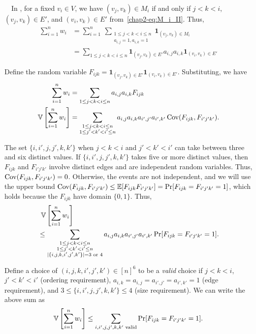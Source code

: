 {%
\smallskip
{}~~In \AlgTwo{}, for a fixed
$v_i \in V$, we have $(v_j, v_k) \in M_i$ if and only if
$j < k < i$, $(v_j, v_k) \in E'$, and $(v_i, v_k) \in E'$ from~\eqref{chap2-eq:M_i_II}. Thus,
\begin{align*}
\sum_{i=1}^n w_i &= \sum_{i=1}^n~\sum_{\substack{1 \leq j < k < i \leq n \\
a_{i,j} = 1, a_{i,k} = 1}} \textbf{1}_{(v_j, v_k) \in M_i} \\
&= \sum_{1 \leq j < k < i \leq n}
\textbf{1}_{(v_j, v_k) \in E'} a_{i,j}a_{i,k}\textbf{1}_{(v_i, v_k) \in E'}
\end{align*}

Define the random variable $F_{ijk} = \textbf{1}_{(v_j, v_k) \in
E'} \textbf{1}_{(v_i, v_k) \in E'}$. Substituting, we have
\begin{align*}
  \sum_{i=1}^n w_i &= \sum_{1 \leq j < k < i \leq n} a_{i,j} a_{i,k}F_{ijk} \\
  \operatorname{\mathbb{V}}\left[\sum_{i=1}^n w_i\right]
  &= \sum_{\substack{1 \leq j < k < i \leq n \\ 1 \leq j' < k' <
  i' \leq n}} a_{i,j} a_{i,k} a_{i',j'} a_{i',k'} \operatorname{\text{Cov}}(F_{ijk}, F_{i'j'k'}).
\end{align*}

The set $\{i,i',j,j',k,k'\}$ when $j < k < i$ and $j' < k' < i'$ can take between
three and six distinct values.
If $\{i,i', j,j', k,k'\}$ takes five or more distinct values, then $F_{ijk}$ and
$F_{i'j'k'}$ involve distinct edges and are independent random variables. Thus,
$\operatorname{\text{Cov}}(F_{ijk}, F_{i'j'k'}) = 0$. Otherwise, the events are not independent, and we will
use the upper bound $\operatorname{\text{Cov}}(F_{ijk}, F_{i'j'k'}) \leq \operatorname{\mathbb{E}}[F_{ijk}F_{i'j'k'}]
=
\Pr[F_{ijk} = F_{i'j'k'} = 1]$, which holds because the $F_{ijk}$ have domain $\{0,1\}$.
Thus,
\begin{align*}
&\;\operatorname{\mathbb{V}}\left[\sum_{i=1}^n w_i \right] \\
&\leq
  \sum_{\substack{1 \leq j < k < i \leq n \\ 1 \leq j' < k' <
  i' \leq n \\ |\{i,j,k,i',j',k'\}| = 3 \text{ or } 4}} a_{i,j} a_{i,k} a_{i',j'} a_{i',k'} \Pr[F_{ijk} = F_{i'j'k'} = 1].
\end{align*}

Define a choice of $(i,j,k,i',j',k') \in [n]^6$ to be a \emph{valid} choice if
$j < k < i$, $j' < k' < i'$ (ordering requirement),
$a_{i,k} = a_{i,j} = a_{i',j'} = a_{i', k'} = 1$ (edge requirement), and
$3 \leq \{i,i',j,j',k,k'\} \leq 4$ (size requirement). We can write the above sum as
\[
  \operatorname{\mathbb{V}}\left[\sum_{i=1}^n w_i \right] \leq
  \sum_{i,i',j,j',k,k'\text{ valid}} \Pr[F_{ijk} = F_{i'j'k'} = 1].
\]

}
